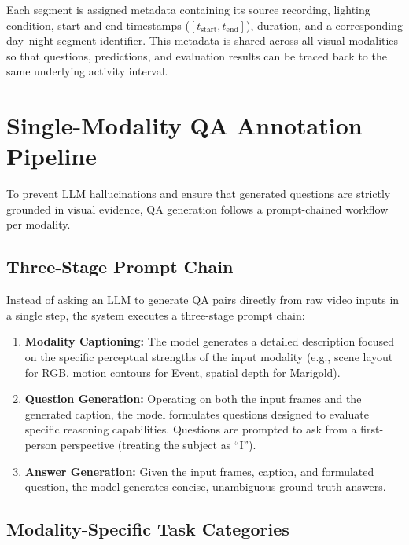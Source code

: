 Each segment is assigned metadata containing its source recording, lighting
condition, start and end timestamps ($[t_{\mathrm{start}}, t_{\mathrm{end}}]$),
duration, and a corresponding day--night segment identifier. This metadata is
shared across all visual modalities so that questions, predictions, and
evaluation results can be traced back to the same underlying activity interval.


\section{Single-Modality QA Annotation Pipeline}
\label{sec:qa_generation_splitting}

To prevent LLM hallucinations and ensure that generated questions are strictly grounded
in visual evidence, QA generation follows a prompt-chained workflow per modality.

\subsection{Three-Stage Prompt Chain}

Instead of asking an LLM to generate QA pairs directly from raw video inputs in a single step,
the system executes a three-stage prompt chain:
\begin{enumerate}
    \item \textbf{Modality Captioning:} The model generates a detailed description focused
          on the specific perceptual strengths of the input modality (e.g., scene layout for RGB,
          motion contours for Event, spatial depth for Marigold).
    \item \textbf{Question Generation:} Operating on both the input frames and the generated
          caption, the model formulates questions designed to evaluate specific reasoning capabilities.
          Questions are prompted to ask from a first-person perspective (treating the subject as ``I'').
    \item \textbf{Answer Generation:} Given the input frames, caption, and formulated question,
          the model generates concise, unambiguous ground-truth answers.
\end{enumerate}

\subsection{Modality-Specific Task Categories}

